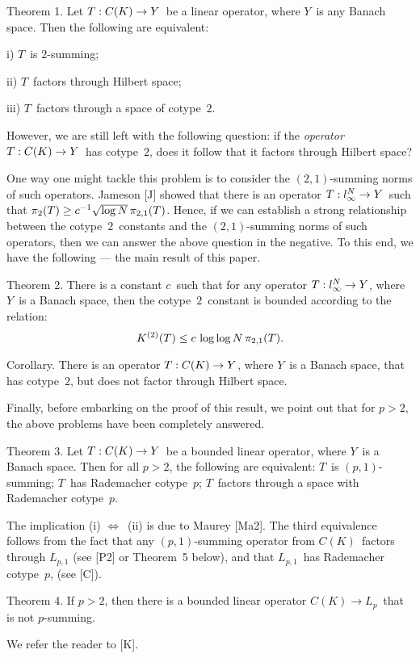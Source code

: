\proclaim Theorem 1. Let $T:C(K)\to Y$\ be a linear operator, where $Y$\ is
any Banach
space. Then the following are equivalent:
\item{i)} $T$\ is $2$-summing;
\item{ii)} $T$\ factors through Hilbert space;
\item{iii)} $T$\ factors through a space of cotype~$2$.

However, we are still left with the following question:
if the {\it operator\/} $T:C(K)\to Y$\ has cotype~$2$, does it follow that
it factors
through Hilbert space?

One way one might tackle this problem is to consider the
$(2,1)$-summing norms
of such operators. Jameson [J] showed that there is an operator
$T:{l_\infty^N}\to Y$\ such
that $\pi_2(T) \ge {c^{-1}} \sqrt{\log N} \, \pi_{2,1}(T)$. Hence, if we can
establish a
strong relationship between the cotype~$2$\ constants and the
$(2,1)$-summing
norms of such operators, then we can answer the above question in the
negative.
To this end, we have the following --- the main result of this paper.

\proclaim Theorem 2. There is a constant $c$\ such that for any
operator
$T:{l_\infty^N}\to Y$, where $Y$\ is a Banach space, then the
cotype~$2$\ constant is bounded according to the relation:
$$ K^{(2)}(T) \le c \, \log\log N \, \pi_{2,1}(T) .$$

\proclaim Corollary. There is an operator $T:C(K)\to Y$, where $Y$\ is a
Banach space,
that has cotype~$2$, but does not factor through Hilbert space.

Finally, before embarking on the proof of this result, we point out
that for
$p>2$, the above problems have been completely answered.

\proclaim Theorem 3. Let $T:C(K)\to Y$\ be a bounded linear operator, where
$Y$\ is a
Banach space. Then for all $p>2$, the following are equivalent:
\itemi $T$\ is $(p,1)$-summing;
\itemii $T$\ has Rademacher cotype~$p$;
\itemiii $T$\ factors through a space with Rademacher cotype~$p$.

The implication (i) $\Leftrightarrow$\ (ii) is due to Maurey [Ma2]. The third
equivalence follows from the fact that any $(p,1)$-summing operator from $C(K)$\
factors through $L_{p,1}$ (see [P2] or Theorem~5 below), and that $L_{p,1}$\ has
Rademacher cotype~$p$, (see  [C]).

\proclaim Theorem 4. If $p>2$, then there is a bounded linear
operator $C(K) \to
L_p$\ that is not $p$-summing.

We refer the reader to [K].

